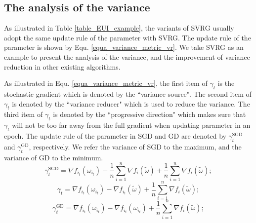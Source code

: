 \documentclass[letterpaper]{article}
\begin{document}
\subsection{The analysis of the variance}
\label{subsect_variance_analysis}
As illustrated  in Table \ref{table_EUI_example},  the variants of SVRG  usually adopt the same update rule of the parameter with SVRG. The update rule of the parameter is shown by Equ. \ref{equa_variance_metric_vr}. We take SVRG  as an example to present the analysis of the variance, and the improvement of variance reduction in other existing algorithms.

As illustrated in Equ. \ref{equa_variance_metric_vr}, the first item of $\gamma_t$ is the stochastic gradient which is denoted by the ``variance source". The second item of $\gamma_t$ is denoted by the ``variance reducer" which is used to reduce the variance. The third item of $\gamma_t$ is denoted by the ``progressive direction" which makes sure that $\gamma_t$ will not be too far away from the full gradient when updating parameter in an epoch. The update rule of the parameter in SGD and GD are denoted by $\gamma_t^{\text{SGD}}$ and $\label{equa_variance_metric_gd}
\gamma_t^{\text{GD}}$, respectively.  We refer the variance of SGD to the maximum, and  the variance of GD to the minimum. 
\begin{equation}
\label{equa_variance_metric_sgd}
 \gamma_t^{\text{SGD}}=\nabla f_{i_t}(\omega_{i_t})-\frac{1}{n}\sum\limits_{i=1}^n\nabla f_i(\tilde{\omega})+\frac{1}{n}\sum\limits_{i=1}^n\nabla f_i(\tilde{\omega});
\end{equation}
\begin{equation}
\label{equa_variance_metric_vr}
\gamma_t=\nabla f_{i_t}(\omega_{i_t})-\nabla f_{i_t}(\tilde{\omega})+\frac{1}{n}\sum\limits_{i=1}^n\nabla f_i(\tilde{\omega});
\end{equation}
\begin{equation}
\label{equa_variance_metric_gd}
\gamma_t^{\text{GD}}=\nabla f_{i_t}(\omega_{i_t})-\nabla f_{i_t}(\omega_{i_t})+\frac{1}{n}\sum\limits_{i=1}^n\nabla f_i(\tilde{\omega});
\end{equation}
\end{document}
